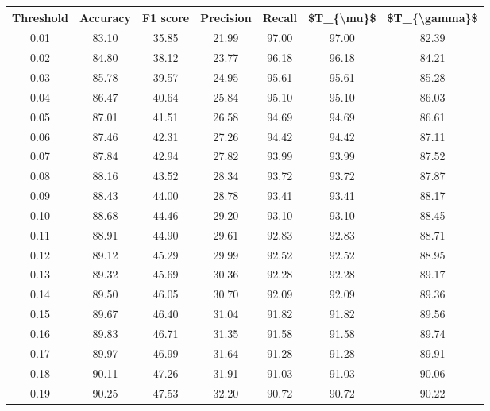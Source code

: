 \begin{tabular}{|c|c|c|c|c|c|c|}
\hline
 Threshold &  Accuracy &  F1 score &  Precision &  Recall &  \$T\_\{\textbackslash mu\}\$ &  \$T\_\{\textbackslash gamma\}\$ \\
\hline
      0.01 &     83.10 &     35.85 &      21.99 &   97.00 &      97.00 &         82.39 \\
      0.02 &     84.80 &     38.12 &      23.77 &   96.18 &      96.18 &         84.21 \\
      0.03 &     85.78 &     39.57 &      24.95 &   95.61 &      95.61 &         85.28 \\
      0.04 &     86.47 &     40.64 &      25.84 &   95.10 &      95.10 &         86.03 \\
      0.05 &     87.01 &     41.51 &      26.58 &   94.69 &      94.69 &         86.61 \\
      0.06 &     87.46 &     42.31 &      27.26 &   94.42 &      94.42 &         87.11 \\
      0.07 &     87.84 &     42.94 &      27.82 &   93.99 &      93.99 &         87.52 \\
      0.08 &     88.16 &     43.52 &      28.34 &   93.72 &      93.72 &         87.87 \\
      0.09 &     88.43 &     44.00 &      28.78 &   93.41 &      93.41 &         88.17 \\
      0.10 &     88.68 &     44.46 &      29.20 &   93.10 &      93.10 &         88.45 \\
      0.11 &     88.91 &     44.90 &      29.61 &   92.83 &      92.83 &         88.71 \\
      0.12 &     89.12 &     45.29 &      29.99 &   92.52 &      92.52 &         88.95 \\
      0.13 &     89.32 &     45.69 &      30.36 &   92.28 &      92.28 &         89.17 \\
      0.14 &     89.50 &     46.05 &      30.70 &   92.09 &      92.09 &         89.36 \\
      0.15 &     89.67 &     46.40 &      31.04 &   91.82 &      91.82 &         89.56 \\
      0.16 &     89.83 &     46.71 &      31.35 &   91.58 &      91.58 &         89.74 \\
      0.17 &     89.97 &     46.99 &      31.64 &   91.28 &      91.28 &         89.91 \\
      0.18 &     90.11 &     47.26 &      31.91 &   91.03 &      91.03 &         90.06 \\
      0.19 &     90.25 &     47.53 &      32.20 &   90.72 &      90.72 &         90.22 \\

\end{tabular}
